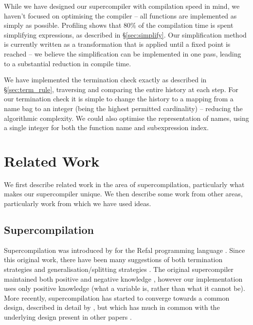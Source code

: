 \documentclass[draft]{sigplanconf}
\begin{document}
While we have designed our supercompiler with compilation speed in mind, we haven't focused on optimising the compiler -- all functions are implemented as simply as possible. Profiling shows that 80\% of the compilation time is spent simplifying expressions, as described in \S\ref{sec:simplify}. Our simplification method is currently written as a transformation that is applied until a fixed point is reached -- we believe the simplification can be implemented in one pass, leading to a substantial reduction in compile time.

We have implemented the termination check exactly as described in \S\ref{sec:term_rule}, traversing and comparing the entire history at each step. For our termination check it is simple to change the history to a mapping from a name bag to an integer (being the highest permitted cardinality) -- reducing the algorithmic complexity. We could also optimise the representation of names, using a single integer for both the function name and subexpression index.

\section{Related Work}

We first describe related work in the area of supercompilation, particularly what makes our supercompiler unique. We then describe some work from other areas, particularly work from which we have used ideas.

\subsection{Supercompilation}
\label{sec:comparison}

Supercompilation was introduced by \citet{supercompilation} for the Refal programming language \cite{refal}. Since this original work, there have been many suggestions of both termination strategies and generalisation/splitting strategies \cite{turchin:generalisation,sorensen:supercompilation,leuschel:homeomorphic}. The original supercompiler maintained both positive and negative knowledge \cite{secher:perfect_supercompilation}, however our implementation uses only positive knowledge (what a variable is, rather than what it cannot be). More recently, supercompilation has started to converge towards a common design, described in detail by \citet{klyuchnikov:hosc}, but which has much in common with the underlying design present in other papers \cite{me:supero,jonsson:supercompilation}.
\end{document}
